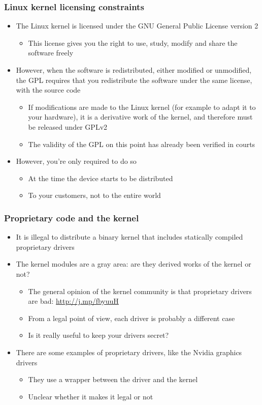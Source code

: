 \begin{frame}
  \frametitle{Linux kernel licensing constraints}
  \begin{itemize}
  \item The Linux kernel is licensed under the GNU General Public
    License version 2
    \begin{itemize}
    \item This license gives you the right to use, study, modify and
      share the software freely
    \end{itemize}
  \item However, when the software is redistributed, either modified
    or unmodified, the GPL requires that you redistribute the software
    under the same license, with the source code
    \begin{itemize}
    \item If modifications are made to the Linux kernel (for example
      to adapt it to your hardware), it is a derivative work of the
      kernel, and therefore must be released under GPLv2
    \item The validity of the GPL on this point has already been
      verified in courts
    \end{itemize}
  \item However, you're only required to do so
    \begin{itemize}
    \item At the time the device starts to be distributed
    \item To your customers, not to the entire world
    \end{itemize}
  \end{itemize}
\end{frame}

\begin{frame}
  \frametitle{Proprietary code and the kernel}
  \begin{itemize}
  \item It is illegal to distribute a binary kernel that includes
    statically compiled proprietary drivers
  \item The kernel modules are a gray area: are they derived works of
    the kernel or not?
    \begin{itemize}
    \item The general opinion of the kernel community is that
      proprietary drivers are bad: \url{http://j.mp/fbyuuH}
    \item From a legal point of view, each driver is probably a
      different case
    \item Is it really useful to keep your drivers secret?
    \end{itemize}
  \item There are some examples of proprietary drivers, like the
    Nvidia graphics drivers
    \begin{itemize}
    \item They use a wrapper between the driver and the kernel
    \item Unclear whether it makes it legal or not
    \end{itemize}
  \end{itemize}
\end{frame}

